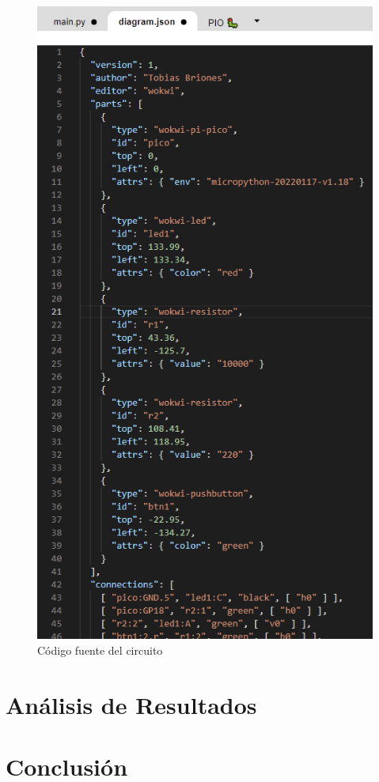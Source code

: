 \documentclass{article}
\begin{document}
    \begin{figure}[H]
        \centering
        \includegraphics[width=0.3\paperwidth]{images/wokwi-example-1-diagram-src-code}
        \caption{Código fuente del circuito}
    \end{figure}

    \section{Análisis de Resultados}\label{sec:análisis-de-resultados}



    \section{Conclusión}\label{sec:conclusion}



    \printbibliography
\end{document}
